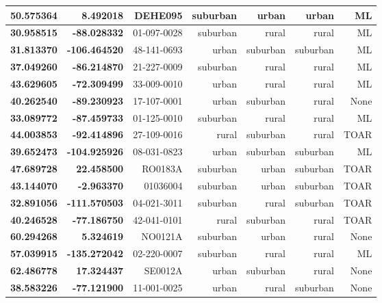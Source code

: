\documentclass[gmd, manuscript]{copernicus}
\begin{document}
\begin{table}[htb!]
\begin{tabular}{|r|r|r|r|r|r|r|}
\textbf{50.575364} & \textbf{8.492018}& DEHE095 & suburban            & urban          & urban                & ML   \\ \hline
\textbf{30.958515} & \textbf{-88.028332}& 01-097-0028 & suburban             & rural       & rural           & ML     \\ \hline
\textbf{31.813370} & \textbf{-106.464520}&  48-141-0693  & urban            & suburban     & suburban          & ML     \\ \hline
\textbf{37.049260} & \textbf{-86.214870}& 21-227-0009  & suburban             & rural        & rural          & ML     \\ \hline
\textbf{43.629605} & \textbf{-72.309499}& 33-009-0010 & urban          & rural           & rural              & ML   \\ \hline
\textbf{40.262540} & \textbf{-89.230923}& 17-107-0001  & urban          & suburban           & rural             & None   \\ \hline
\textbf{33.089772} & \textbf{-87.459733}& 01-125-0010  & suburban          & rural           & rural          & ML   \\ \hline
\textbf{44.003853} & \textbf{-92.414896}& 27-109-0016 & rural          & suburban           & rural             & TOAR     \\ \hline
\textbf{39.652473} & \textbf{-104.925926}& 08-031-0823 & urban          & suburban           & suburban          & ML  \\ \hline
\textbf{47.689728} & \textbf{22.458500}& RO0183A & suburban          & urban          & suburban          & TOAR   \\ \hline
\textbf{43.144070} & \textbf{-2.963370}& 01036004  & suburban             & urban        & suburban          & TOAR     \\ \hline
\textbf{32.891056} & \textbf{-111.570503}& 04-021-3011 & suburban          & rural           & suburban              & TOAR  \\ \hline
\textbf{40.246528} & \textbf{-77.186750}& 42-041-0101  & rural          & suburban           & rural             & TOAR   \\ \hline
\textbf{60.294268} & \textbf{5.324619}& NO0121A  & suburban          & urban           & rural          & None   \\ \hline
\textbf{57.039915} & \textbf{-135.272042}& 02-220-0007	 & suburban          & rural           & rural             & ML     \\ \hline
\textbf{62.486778} & \textbf{17.324437}& SE0012A & urban          & suburban           & rural          & None \\ \hline
\textbf{38.583226} & \textbf{-77.121900}& 11-001-0025 & urban          & rural          & suburban          & None   \\ \hline
\end{tabular}
\label{mis_class}
\end{table}
\end{document}
